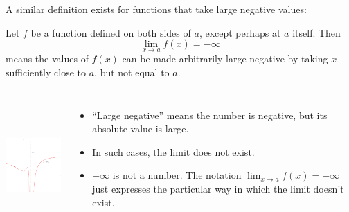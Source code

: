 \begin{frame}
A similar definition exists for functions that take large negative values:
\begin{definition}
Let $f$ be a function defined on both sides of $a$, except perhaps at $a$ itself.  Then
\[
\lim_{x\rightarrow a}f(x) = -\infty 
\]
means the values of $f(x)$ can be made arbitrarily large negative by taking $x$ sufficiently close to $a$, but not equal to $a$.
\end{definition}
\begin{columns}[c]
\ \includegraphics[height=4cm]{limits/pictures/02-02-neginf.pdf}%
\begin{itemize}
\item<2->  ``Large negative'' means the number is negative, but its absolute value is large.
\item<3->  In such cases, the limit does not exist.
\item<4->  $-\infty$ is not a number.  The notation $\lim_{x\rightarrow a}f(x) = -\infty$ just expresses the particular way in which the limit doesn't exist.
\end{itemize}
\end{columns}
\end{frame}


